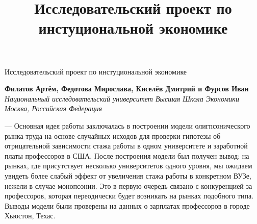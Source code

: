 \documentclass[a4paper, 12pt]{article}
\title{Исследовательский проект по инстуциональной экономике}
\theoremstyle{definition}
\theoremstyle{plain}
\begin{document}
\begin{center}
{\Large\sc Исследовательский проект по инстуциональной экономике}\vspace{0.2cm}\\
\end{center}
\begin{center}
{\bf Филатов Артём, Федотова Мирослава, Киселёв Дмитрий и Фурсов Иван}\vspace{0.1cm}\\
{\it Национальный исследовательский университет Высшая Школа Экономики\\ 
Москва, Российская Федерация}\vspace{0.1cm}\\
\end{center}


— Основная идея работы заключалась в построении модели олигпсонического рынка труда на основе случайных исходов для проверки гипотезы об отрицательной зависимости стажа работы в одном университете и заработной платы профессоров в США. После построения модели был получен вывод: на рынках, где присутствует несколько университетов одного уровня, мы ожидаем увидеть более слабый эффект от увеличения стажа работы в конкретном ВУЗе, нежели в случае монопсонии. Это в первую очередь связано с конкуренцией за профессоров, которая переодически будет возникать на рынках подобного типа. Выводы модели были проверены на данных о зарплатах профессоров в городе Хьюстон, Техас. 
\end{document}
